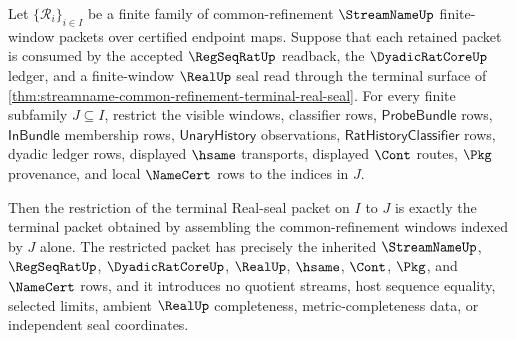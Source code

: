 \begin{theorem}
\label{thm:streamname-common-refinement-terminal-subcover-exactness}
Let $\{\mathcal R_i\}_{i \in I}$ be a finite family of common-refinement $\StreamNameUp$ finite-window packets over certified endpoint maps. Suppose that each retained packet is consumed by the accepted $\RegSeqRatUp$ readback, the $\DyadicRatCoreUp$ ledger, and a finite-window $\RealUp$ seal read through the terminal surface of \autoref{thm:streamname-common-refinement-terminal-real-seal}. For every finite subfamily $J \subseteq I$, restrict the visible windows, classifier rows, $\mathsf{ProbeBundle}$ rows, $\mathsf{InBundle}$ membership rows, $\mathsf{UnaryHistory}$ observations, $\mathsf{RatHistoryClassifier}$ rows, dyadic ledger rows, displayed $\hsame$ transports, displayed $\Cont$ routes, $\Pkg$ provenance, and local $\NameCert$ rows to the indices in $J$.

Then the restriction of the terminal Real-seal packet on $I$ to $J$ is exactly the terminal packet obtained by assembling the common-refinement windows indexed by $J$ alone. The restricted packet has precisely the inherited $\StreamNameUp$, $\RegSeqRatUp$, $\DyadicRatCoreUp$, $\RealUp$, $\hsame$, $\Cont$, $\Pkg$, and $\NameCert$ rows, and it introduces no quotient streams, host sequence equality, selected limits, ambient $\RealUp$ completeness, metric-completeness data, or independent seal coordinates.
\end{theorem}
